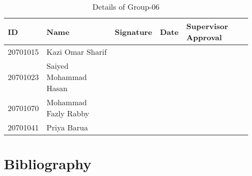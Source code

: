 \documentclass[12pt, a4paper]{article}
\begin{document}

%
\begin{table}[h]
\begin{tabular}{|l|l|l|l|l|}
\hline
ID       & Name                  & Signature & Date & Supervisor Approval \\ \hline
20701015 & Kazi Omar Sharif      &           &      &                     \\ \hline
20701023 & Saiyed Mohammad Hasan &           &      &                     \\ \hline
20701070 & Mohammad Fazly Rabby  &           &      &                     \\ \hline
20701041 & Priya Barua           &           &      &                     \\ \hline
\end{tabular}
\caption{Details of Group-06}
\label{tab:my-table}
\end{table}
\clearpage



\setcounter{secnumdepth}{5}
\setcounter{tocdepth}{5}
\tableofcontents
\listoffigures
\listoftables
\lstlistoflistings






























\section{Bibliography} 
\label{sec:bibliography}




%

\end{document}
